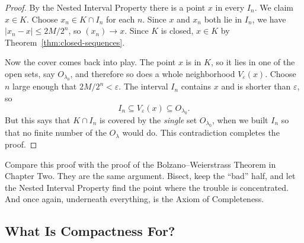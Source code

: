 \begin{proof}
By the Nested Interval Property there is a point $x$ in every $I_n$.  We claim $x \in K$.  Choose $x_n \in K \cap I_n$ for each $n$.  Since $x$ and $x_n$ both lie in $I_n$, we have $|x_n - x| \leq 2M/2^n$, so $(x_n) \to x$.  Since $K$ is closed, $x \in K$ by Theorem~\ref{thm:closed-sequences}.

Now the cover comes back into play.  The point $x$ is in $K$, so it lies in one of the open sets, say $O_{\lambda_0}$, and therefore so does a whole neighborhood $V_{\varepsilon}(x)$.  Choose $n$ large enough that $2M/2^n < \varepsilon$.  The interval $I_n$ contains $x$ and is shorter than $\varepsilon$, so
\[ I_n \subseteq V_{\varepsilon}(x) \subseteq O_{\lambda_0}. \]
But this says that $K \cap I_n$ is covered by the \emph{single} set $O_{\lambda_0}$, when we built $I_n$ so that no finite number of the $O_{\lambda}$ would do.  This contradiction completes the proof.
\end{proof}

\begin{marginfigure}
\centering
{}
\caption{The end of the proof.  The intervals $I_n$ shrink onto $x$, so eventually one of them fits inside the neighborhood of $x$ that a single set of the cover provides.}
\end{marginfigure}

Compare this proof with the proof of the Bolzano--Weierstrass Theorem in Chapter Two.  They are the same argument.  Bisect, keep the ``bad'' half, and let the Nested Interval Property find the point where the trouble is concentrated.  And once again, underneath everything, is the Axiom of Completeness.

\subsection{What Is Compactness For?}

